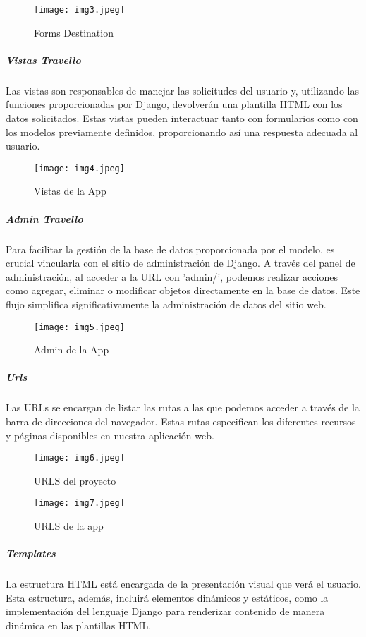 \documentclass[10pt, a4paper]{article}
\begin{document}
		\begin{figure}[h]
			\centering
			\texttt{[image: img3.jpeg]}
			\caption{Forms Destination}
		\end{figure}
		\vspace*{6cm}
	\subparagraph*{Vistas Travello}
		\begin{flushleft}
			Las vistas son responsables de manejar las solicitudes del usuario y, utilizando las funciones proporcionadas por Django, devolverán una plantilla HTML con los datos solicitados. Estas vistas pueden interactuar tanto con formularios como con los modelos previamente definidos, proporcionando así una respuesta adecuada al usuario.
		\end{flushleft}
		\begin{figure}[h]
			\centering
			\texttt{[image: img4.jpeg]}
			\caption{Vistas de la App}
		\end{figure}
	\subparagraph*{Admin Travello}
		\begin{flushleft}
			Para facilitar la gestión de la base de datos proporcionada por el modelo, es crucial vincularla con el sitio de administración de Django. A través del panel de administración, al acceder a la URL con 'admin/', podemos realizar acciones como agregar, eliminar o modificar objetos directamente en la base de datos. Este flujo simplifica significativamente la administración de datos del sitio web.
		\end{flushleft}
		\begin{figure}[h]
			\centering
			\texttt{[image: img5.jpeg]}
			\caption{Admin de la App}
		\end{figure}
	\vspace*{2cm}
	\subparagraph*{Urls}
		\begin{flushleft}
			Las URLs se encargan de listar las rutas a las que podemos acceder a través de la barra de direcciones del navegador. Estas rutas especifican los diferentes recursos y páginas disponibles en nuestra aplicación web.
		\end{flushleft}
		\begin{figure}[h]
			\centering
			\texttt{[image: img6.jpeg]}
			\caption{URLS del proyecto}
		\end{figure}
		\begin{figure}[h]
			\centering
			\texttt{[image: img7.jpeg]}
			\caption{URLS de la app}
		\end{figure}
	\subparagraph*{Templates}
		\begin{flushleft}
			La estructura HTML está encargada de la presentación visual que verá el usuario. Esta estructura, además, incluirá elementos dinámicos y estáticos, como la implementación del lenguaje Django para renderizar contenido de manera dinámica en las plantillas HTML.
		\end{flushleft}
\end{document}
